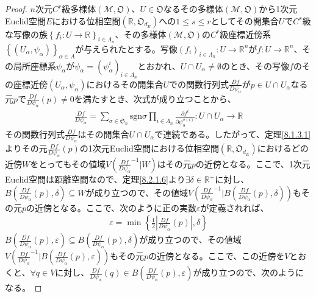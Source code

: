 \documentclass[dvipdfmx]{jsarticle}
\begin{document}
\begin{proof}
$n$次元$C^{r}$級多様体$\left( \mathcal{M},\mathfrak{O} \right)$、$U \in \mathfrak{O}$なるその多様体$\left( \mathcal{M},\mathfrak{O} \right)$から1次元Euclid空間$E$における位相空間$\left( \mathbb{R},\mathfrak{O}_{d_{E}} \right)$への$1\leq s \leq r$としてその開集合$U$で$C^{s}$級な写像の族$\left\{ f_i :U \rightarrow \mathbb{R} \right\}_{i\in \varLambda_n } $、その多様体$\left( \mathcal{M},\mathfrak{O} \right)$の$C^{r}$級座標近傍系$\left\{ \left( U_{\alpha},\psi_{\alpha} \right) \right\}_{\alpha \in A}$が与えられたとする。写像$\left( f_i \right)_{i\in \varLambda_n } :U \rightarrow \mathbb{R}^n $が$f:U \rightarrow \mathbb{R}^n $、その局所座標系$\psi_\alpha $が$\psi_\alpha =\left( \psi_\alpha^i \right)_{i\in \varLambda_n }$とおかれ、$U\cap U_\alpha \ne \emptyset $のとき、その写像$f$のその座標近傍$\left(U_\alpha ,\psi_\alpha \right)$におけるその開集合$U$での関数行列式$\frac{Df}{D\psi_\alpha }$が$p\in U\cap U_\alpha $なる元$p$で$\frac{Df}{D\psi_\alpha } (p) \ne 0$を満たすとき、次式が成り立つことから、
\begin{align*}
\frac{Df}{D\psi_\alpha } = \sum_{\sigma \in \mathfrak{S}_n } \mathrm{sgn} \sigma \prod_{i\in \varLambda_n } \frac{\partial f^i }{\partial \psi_\alpha^{\sigma (i)} } : U\cap U_\alpha \rightarrow \mathbb{R}
\end{align*}その関数行列式$\frac{Df}{D\psi_\alpha }$はその開集合$U\cap U_\alpha $で連続である。したがって、定理\ref{8.1.3.1}よりその元$\frac{Df}{D\psi_\alpha }(p)$の1次元Euclid空間における位相空間$\left( \mathbb{R} ,\mathfrak{O}_{d_E } \right)$におけるどの近傍$W$をとってもその値域$V\left({\frac{Df}{D\psi_\alpha } }^{-1} | W\right) $はその元$p$の近傍となる。ここで、1次元Euclid空間は距離空間なので、定理\ref{8.2.1.6}より$\exists \delta \in \mathbb{R}^+ $に対し、$B\left(\frac{Df}{D\psi_\alpha }(p) ,\delta \right) \subseteq W$が成り立つので、その値域$V\left({\frac{Df}{D\psi_\alpha } }^{-1} | B\left(\frac{Df}{D\psi_\alpha }(p) ,\delta \right) \right) $もその元$p$の近傍となる。ここで、次のように正の実数$\varepsilon$が定義されれば、
\begin{align*}
\varepsilon = \min \left\{ \frac{1}{2} \left| \frac{Df}{D\psi_\alpha }(p) \right| ,\delta \right\}
\end{align*}
$B\left(\frac{Df}{D\psi_\alpha }(p) ,\varepsilon \right) \subseteq B\left(\frac{Df}{D\psi_\alpha }(p) ,\delta \right) $が成り立つので、その値域$V\left({\frac{Df}{D\psi_\alpha } }^{-1} | B\left(\frac{Df}{D\psi_\alpha }(p) ,\varepsilon \right) \right) $もその元$p$の近傍となる。ここで、この近傍を$V$とおくと、$\forall q\in V$に対し、$\frac{Df}{D\psi_\alpha }(q) \in B\left(\frac{Df}{D\psi_\alpha }(p) ,\varepsilon \right) $が成り立つので、次のようになる。

\end{proof}
\end{document}
